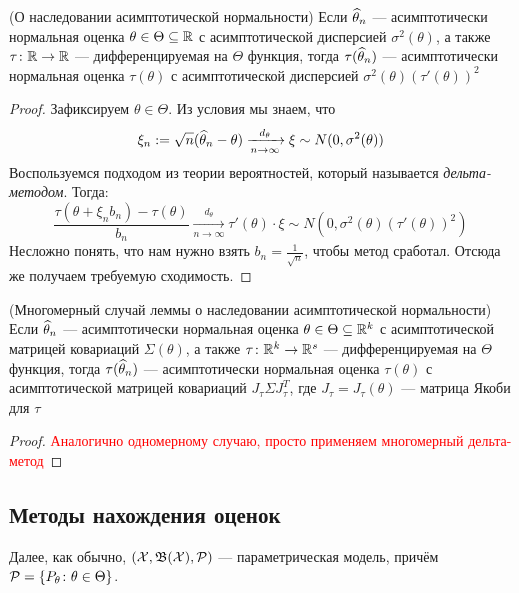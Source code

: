 \begin{lemma} (О наследовании асимптотической нормальности)
	Если $\widehat{\theta}_n$ --- асимптотически нормальная оценка $\theta \in \Theta \subseteq \mathbb{R}$ с асимптотической дисперсией $\sigma^2(\theta)$, а также $\tau \colon \mathbb{R} \to \mathbb{R}$ --- дифференцируемая на $\Theta$ функция, тогда $\tau(\widehat{\theta}_n)$ --- асимптотически нормальная оценка $\tau(\theta)$ с асимптотической дисперсией $\sigma^2(\theta)(\tau'(\theta))^2$
\end{lemma}

\begin{proof}
	Зафиксируем $\theta \in \Theta$. Из условия мы знаем, что
	\[
		\xi_n := \sqrt{n}(\widehat{\theta}_n - \theta) \xrightarrow[n \to \infty]{d_\theta} \xi \sim N(0, \sigma^2(\theta))
	\]
	Воспользуемся подходом из теории вероятностей, который называется \textit{дельта-методом}. Тогда:
	\[
		\frac{\tau(\theta + \xi_nb_n) - \tau(\theta)}{b_n} \xrightarrow[n \to \infty]{d_\theta} \tau'(\theta) \cdot \xi \sim N(0, \sigma^2(\theta)(\tau'(\theta))^2)
	\]
	Несложно понять, что нам нужно взять $b_n = \frac{1}{\sqrt{n}}$, чтобы метод сработал. Отсюда же получаем требуемую сходимость.
\end{proof}

\begin{proposition} (Многомерный случай леммы о наследовании асимптотической нормальности)
	Если $\widehat{\theta}_n$ --- асимптотически нормальная оценка $\theta \in \Theta \subseteq \mathbb{R}^k$ с асимптотической матрицей ковариаций $\Sigma(\theta)$, а также $\tau \colon \mathbb{R}^k \to \mathbb{R}^s$ --- дифференцируемая на $\Theta$ функция, тогда $\tau(\widehat{\theta}_n)$ --- асимптотически нормальная оценка $\tau(\theta)$ с асимптотической матрицей ковариаций $J_\tau \Sigma J_\tau^T$, где $J_\tau = J_\tau(\theta)$ --- матрица Якоби для $\tau$
\end{proposition}

\begin{proof}
	\textcolor{red}{Аналогично одномерному случаю, просто применяем многомерный дельта-метод}
\end{proof}

\subsection{Методы нахождения оценок}

\begin{note}
	Далее, как обычно, $(\mathcal{X}, \mathfrak{B}(\mathcal{X}), \mathcal{P})$ --- параметрическая модель, причём $\mathcal{P} = \{P_\theta \colon \theta \in \Theta\}$.
\end{note}

